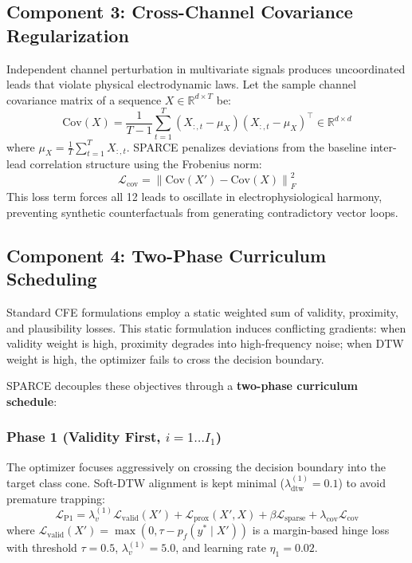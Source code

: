\documentclass[conference]{IEEEtran}
\newcommand{\R}{\mathbb{R}}
\newcommand{\norm}[1]{\left\lVert#1\right\rVert}
\begin{document}
\subsection{Component 3: Cross-Channel Covariance Regularization}
Independent channel perturbation in multivariate signals produces uncoordinated leads that violate physical electrodynamic laws. Let the sample channel covariance matrix of a sequence $X \in \R^{d \times T}$ be:
\begin{equation}
    \text{Cov}(X) = \frac{1}{T - 1} \sum_{t=1}^T (X_{:, t} - \mu_X)(X_{:, t} - \mu_X)^\top \in \R^{d \times d}
\end{equation}
where $\mu_X = \frac{1}{T}\sum_{t=1}^T X_{:, t}$. SPARCE penalizes deviations from the baseline inter-lead correlation structure using the Frobenius norm:
\begin{equation}
    \mathcal{L}_{\text{cov}} = \norm{\text{Cov}(X') - \text{Cov}(X)}_F^2
\end{equation}
This loss term forces all 12 leads to oscillate in electrophysiological harmony, preventing synthetic counterfactuals from generating contradictory vector loops.

\subsection{Component 4: Two-Phase Curriculum Scheduling}
Standard CFE formulations employ a static weighted sum of validity, proximity, and plausibility losses. This static formulation induces conflicting gradients: when validity weight is high, proximity degrades into high-frequency noise; when DTW weight is high, the optimizer fails to cross the decision boundary.

SPARCE decouples these objectives through a \textbf{two-phase curriculum schedule}:
\subsubsection{Phase 1 (Validity First, $i = 1 \dots I_1$)}
The optimizer focuses aggressively on crossing the decision boundary into the target class cone. Soft-DTW alignment is kept minimal ($\lambda_{\text{dtw}}^{(1)} = 0.1$) to avoid premature trapping:
\begin{equation}
    \mathcal{L}_{\text{P1}} = \lambda_v^{(1)} \mathcal{L}_{\text{valid}}(X') + \mathcal{L}_{\text{prox}}(X', X) + \beta \mathcal{L}_{\text{sparse}} + \lambda_{\text{cov}} \mathcal{L}_{\text{cov}}
\end{equation}
where $\mathcal{L}_{\text{valid}}(X') = \max(0, \tau - p_f(y^* \mid X'))$ is a margin-based hinge loss with threshold $\tau = 0.5$, $\lambda_v^{(1)} = 5.0$, and learning rate $\eta_1 = 0.02$.
\end{document}
